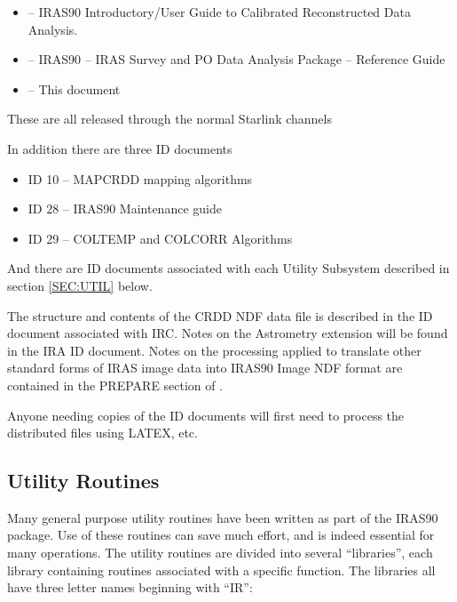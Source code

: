 \begin{itemize}

\item {} --
IRAS90 Introductory/User Guide to Calibrated Reconstructed Data Analysis.
 
\item {} --
IRAS90 -- IRAS Survey and PO Data Analysis Package -- Reference Guide

\item {} -- This document

\end{itemize}

These are all released through the normal Starlink channels

In addition there are three ID documents

\begin{itemize}

\item ID 10 -- MAPCRDD mapping algorithms
 
\item ID 28 -- IRAS90 Maintenance guide

\item ID 29 -- COLTEMP and COLCORR Algorithms

\end{itemize}

And there are ID documents associated with each Utility Subsystem described in
section \ref{SEC:UTIL} below.

The structure and contents of the CRDD NDF data file is described in the ID
document associated with IRC. Notes on the Astrometry extension will be found
in the IRA ID document. Notes on the processing applied to translate other 
standard forms of IRAS image data into IRAS90 Image NDF format are contained
in the PREPARE section of .

Anyone needing copies of the ID documents will first need to process the 
distributed files using {\small LATEX}, etc. 


\subsection{Utility Routines
\label{SEC:UTIL}}

Many general purpose utility routines have been written as part of the
{\small IRAS90} package. Use of these routines can save much effort,
and is indeed essential for many operations. The utility routines are
divided into several ``libraries'', each library containing routines
associated with a specific function. The libraries all have three
letter names beginning with ``IR'':

